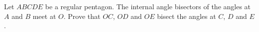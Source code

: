 Let $ABCDE$ be a regular pentagon. The internal angle bisectors of the angles at $A$ and $B$ meet at $O$. Prove that $OC$, $OD$ and $OE$ bisect the angles at $C$, $D$ and $E$.
